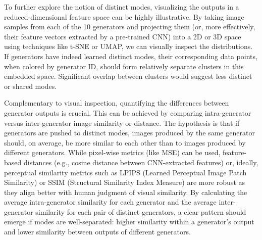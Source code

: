 To further explore the notion of distinct modes, visualizing the outputs in a reduced-dimensional feature space can be highly illustrative. By taking image samples from each of the 10 generators and projecting them (or, more effectively, their feature vectors extracted by a pre-trained CNN) into a 2D or 3D space using techniques like t-SNE or UMAP, we can visually inspect the distributions. If generators have indeed learned distinct modes, their corresponding data points, when colored by generator ID, should form relatively separate clusters in this embedded space. Significant overlap between clusters would suggest less distinct or shared modes.

Complementary to visual inspection, quantifying the differences between generator outputs is crucial. This can be achieved by comparing intra-generator versus inter-generator image similarity or distance. The hypothesis is that if generators are pushed to distinct modes, images produced by the same generator should, on average, be more similar to each other than to images produced by different generators. While pixel-wise metrics (like MSE) can be used, feature-based distances (e.g., cosine distance between CNN-extracted features) or, ideally, perceptual similarity metrics such as LPIPS (Learned Perceptual Image Patch Similarity) or SSIM (Structural Similarity Index Measure) are more robust as they align better with human judgment of visual similarity. By calculating the average intra-generator similarity for each generator and the average inter-generator similarity for each pair of distinct generators, a clear pattern should emerge if modes are well-separated: higher similarity within a generator's output and lower similarity between outputs of different generators.

\newpage